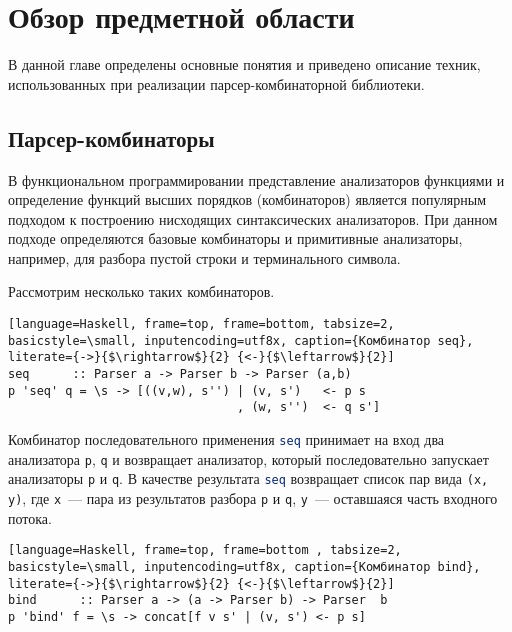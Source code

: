 \section{Обзор предметной области}
В данной главе определены основные понятия и приведено описание техник, использованных при реализации парсер-комбинаторной библиотеки.

    \subsection{Парсер-комбинаторы}
В функциональном программировании представление анализаторов функциями и определение функций высших порядков (комбинаторов) является популярным подходом к построению нисходящих синтаксических анализаторов. При данном подходе определяются базовые комбинаторы и примитивные анализаторы, например, для разбора пустой строки и терминального символа.

Рассмотрим несколько таких комбинаторов.

\begin{lstlisting}[language=Haskell, frame=top, frame=bottom, tabsize=2, basicstyle=\small, inputencoding=utf8x, caption={Комбинатор seq}, literate={->}{$\rightarrow$}{2} {<-}{$\leftarrow$}{2}]
seq      :: Parser a -> Parser b -> Parser (a,b)
p 'seq' q = \s -> [((v,w), s'') | (v, s')   <- p s
                                , (w, s'')  <- q s']
\end{lstlisting}

Комбинатор последовательного применения \lstinline[language=Haskell]{seq} принимает на вход два анализатора \lstinline[language=Haskell]{p}, \lstinline[language=Haskell]{q} и возвращает анализатор, который последовательно запускает анализаторы \lstinline[language=Haskell]{p} и \lstinline[language=Haskell]{q}. В качестве результата \lstinline[language=Haskell]{seq} возвращает список пар вида \lstinline[language=Haskell]{(x, y)}, где \lstinline[language=Haskell]{x}~--- пара из результатов разбора \lstinline[language=Haskell]{p} и \lstinline[language=Haskell]{q}, \lstinline[language=Haskell]{y}~--- оставшаяся часть входного потока.

\begin{lstlisting}[language=Haskell, frame=top, frame=bottom , tabsize=2, basicstyle=\small, inputencoding=utf8x, caption={Комбинатор bind}, literate={->}{$\rightarrow$}{2} {<-}{$\leftarrow$}{2}]
bind      :: Parser a -> (a -> Parser b) -> Parser  b
p 'bind' f = \s -> concat[f v s' | (v, s') <- p s]
\end{lstlisting}
   
